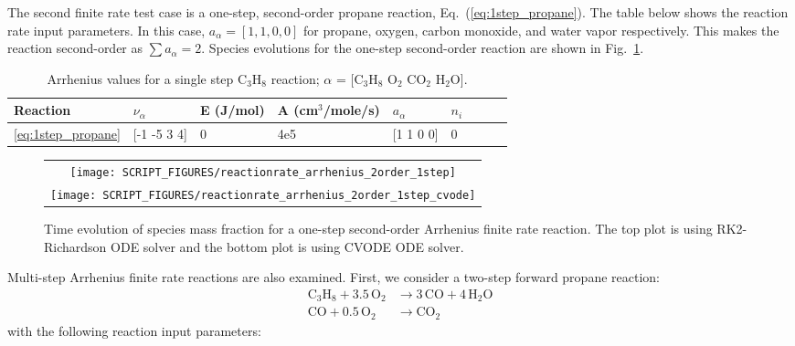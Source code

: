 \documentclass[11pt]{book}
\begin{document}
The second finite rate test case is a one-step, second-order propane reaction, Eq.~(\ref{eq:1step_propane}). The table below shows the reaction rate input parameters. In this case, $a_{\alpha}=[1,1,0,0]$  for propane, oxygen, carbon monoxide, and water vapor respectively. This makes the reaction second-order as $\sum a_{\alpha}=2$. Species evolutions for the one-step second-order reaction are shown in Fig.~\ref{fig:Arrhenius_2Order_1step}.
\begin{table}[ht]
\begin{center}
\caption[Arrhenius values for a single step C$_3$H$_8$ reaction]{Arrhenius values for a single step C$_3$H$_8$ reaction; $\alpha$ = [$\mathrm{C_3H_8}$ $\mathrm{O_2}$ $\mathrm{CO_2}$ $\mathrm{H_2O}$].}
\label{single_step_c3h8}
\begin{tabular}{|l|l|l|l|l|l|l|l|l|}
\hline Reaction & $\nu_{\alpha}$ & E (J/mol) & A (cm$^3$/mole/s) & $a_{\alpha}$ & $n_i$  \\ \hline \hline
\ref{eq:1step_propane} & [-1 -5 3 4] & 0 & 4e5 & [1 1 0 0] & 0 \\ \hline
\end{tabular}
\end{center}
\end{table}
\begin{figure}[h!]
\centering
\begin{tabular}{c}
\texttt{[image: SCRIPT\_FIGURES/reactionrate\_arrhenius\_2order\_1step]} \\
\texttt{[image: SCRIPT\_FIGURES/reactionrate\_arrhenius\_2order\_1step\_cvode]}
\end{tabular}
\caption[Species evolution in a 2-order 1-step finite rate reaction]{Time evolution of species mass fraction for a one-step second-order Arrhenius finite rate reaction. The top plot is using RK2-Richardson ODE solver and the bottom plot is using CVODE ODE solver.}
\label{fig:Arrhenius_2Order_1step}
\end{figure}
Multi-step Arrhenius finite rate reactions are also examined. First, we consider a two-step forward propane reaction:
\begin{subequations}
\begin{align}
\label{eq:2step_propane_a}
\mathrm{C_3H_8+3.5 \, O_2} &\rightarrow  \mathrm{3 \, CO + 4 \, H_2O} \\
\label{eq:2step_propane_b}
\mathrm{CO+0.5 \, O_2} &\rightarrow \mathrm{CO_2}
\end{align}
\end{subequations}
with the following reaction input parameters:
\end{document}
